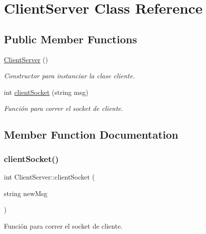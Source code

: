 \hypertarget{classClientServer}{}\section{Client\+Server Class Reference}
\label{classClientServer}
\subsection*{Public Member Functions}
\begin{DoxyCompactItemize}
\item 
\mbox{\label{classClientServer_a2c489e47506bfdf791a5ef166a838a01}} 
\hyperlink{classClientServer_a2c489e47506bfdf791a5ef166a838a01}{Client\+Server} ()
\begin{DoxyCompactList}\small\item\em Constructor para instanciar la clase cliente. \end{DoxyCompactList}\item 
int \hyperlink{classClientServer_a10f3e8caeaeaae7d167d2410aad40233}{client\+Socket} (string msg)
\begin{DoxyCompactList}\small\item\em Función para correr el socket de cliente. \end{DoxyCompactList}\end{DoxyCompactItemize}


\subsection{Member Function Documentation}
\mbox{\label{classClientServer_a10f3e8caeaeaae7d167d2410aad40233}} 
\subsubsection{\texorpdfstring{client\+Socket()}{clientSocket()}}
{\footnotesize\ttfamily int Client\+Server\+::client\+Socket (\begin{DoxyParamCaption}\item[{string}]{new\+Msg }\end{DoxyParamCaption})}



Función para correr el socket de cliente. 


